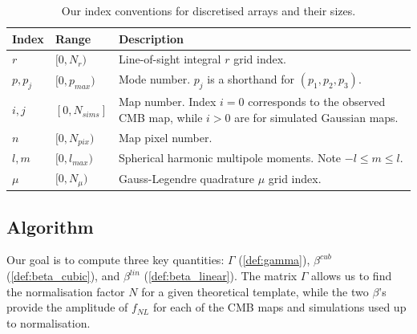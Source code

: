 \documentclass[a4paper,12pt,times,custombib,print,index]{Classes/PhDThesisPSnPDF} %
\providecommand{\DIFadd}[1]{{\protect\color{blue}\uwave{#1}}} %
\providecommand{\DIFdel}[1]{{\protect\color{red}\sout{#1}}}                      %
\providecommand{\DIFaddbegin}{} %
\providecommand{\DIFaddend}{} %
\providecommand{\DIFdelbegin}{} %
\providecommand{\DIFdelend}{} %
\providecommand{\DIFaddFL}[1]{\DIFadd{#1}} %
\providecommand{\DIFdelFL}[1]{\DIFdel{#1}} %
\providecommand{\DIFaddbeginFL}{} %
\providecommand{\DIFaddendFL}{} %
\providecommand{\DIFdelbeginFL}{} %
\providecommand{\DIFdelendFL}{} %
\newcommand{\DIFscaledelfig}{0.5}
\newlength{\DIFdelgraphicswidth} %
\newlength{\DIFdelgraphicsheight} %
\newcommand{\DIFaddincludegraphics}[2][]{{\color{blue}\fbox{\DIFOincludegraphics[#1]{#2}}}} %
\newcommand{\DIFdelincludegraphics}[2][]{%
\sbox{\DIFdelgraphicsbox}{\DIFOincludegraphics[#1]{#2}}%
\settoboxwidth{\DIFdelgraphicswidth}{\DIFdelgraphicsbox} %
\settoboxtotalheight{\DIFdelgraphicsheight}{\DIFdelgraphicsbox} %
\scalebox{\DIFscaledelfig}{%
\parbox[b]{\DIFdelgraphicswidth}{\usebox{\DIFdelgraphicsbox}\\[-\baselineskip] \rule{\DIFdelgraphicswidth}{0em}}\llap{\resizebox{\DIFdelgraphicswidth}{\DIFdelgraphicsheight}{%
\setlength{\unitlength}{\DIFdelgraphicswidth}%
\begin{picture}(1,1)%
\thicklines\linethickness{2pt} %
{\color[rgb]{1,0,0}\put(0,0){\framebox(1,1){}}}%
{\color[rgb]{1,0,0}\put(0,0){\line( 1,1){1}}}%
{\color[rgb]{1,0,0}\put(0,1){\line(1,-1){1}}}%
\end{picture}%
}\hspace*{3pt}}} %
} %
\DeclareRobustCommand{\DIFaddbegin}{\DIFOaddbegin \let\includegraphics\DIFaddincludegraphics} %
\DeclareRobustCommand{\DIFaddend}{\DIFOaddend \let\includegraphics\DIFOincludegraphics} %
\DeclareRobustCommand{\DIFdelbegin}{\DIFOdelbegin \let\includegraphics\DIFdelincludegraphics} %
\DeclareRobustCommand{\DIFdelend}{\DIFOaddend \let\includegraphics\DIFOincludegraphics} %
\DeclareRobustCommand{\DIFaddbeginFL}{\DIFOaddbeginFL \let\includegraphics\DIFaddincludegraphics} %
\DeclareRobustCommand{\DIFaddendFL}{\DIFOaddendFL \let\includegraphics\DIFOincludegraphics} %
\DeclareRobustCommand{\DIFdelbeginFL}{\DIFOdelbeginFL \let\includegraphics\DIFdelincludegraphics} %
\DeclareRobustCommand{\DIFdelendFL}{\DIFOaddendFL \let\includegraphics\DIFOincludegraphics} %
\begin{document}
\begin{table}[htbp]
	\caption{Our index conventions for discretised arrays and their sizes.}
	\centering
	\label{table:index_conventions}
	\renewcommand{\arraystretch}{1.5} 
	\begin{tabular}{m{}  m{}  m{}} \toprule
		Index & Range & Description \\

		\midrule
		$r$ & $[0, N_r)$ & Line-of-sight integral $r$ grid index. \\

		$p, p_j$ & \DIFdelbeginFL \DIFdelFL{$[0, p_{max})$ }\DIFdelendFL \DIFaddbeginFL \DIFaddFL{$[0, p_\text{max})$ }\DIFaddendFL & Mode number. $p_j$ is a shorthand for $(p_1, p_2, p_3)$. \\

		$i,j$ & \DIFdelbeginFL \DIFdelFL{$[0, N_{sims}]$ }\DIFdelendFL \DIFaddbeginFL \DIFaddFL{$[0, N_\text{sims}]$ }\DIFaddendFL & Map number. Index $i=0$ corresponds to the observed CMB map, while $i>0$ are for simulated Gaussian maps. \\			

		$n$ & \DIFdelbeginFL \DIFdelFL{$[0, N_{pix})$ }\DIFdelendFL \DIFaddbeginFL \DIFaddFL{$[0, N_\text{pix})$ }\DIFaddendFL & Map pixel number. \\ 

		$l,m$ & \DIFdelbeginFL \DIFdelFL{$[0, l_{max})$ }\DIFdelendFL \DIFaddbeginFL \DIFaddFL{$[0, l_\text{max})$ }\DIFaddendFL & Spherical harmonic multipole moments. Note $-l \le m \le l$. \\

		$\mu$ & $[0, N_\mu)$ & Gauss-Legendre quadrature $\mu$ grid index. \\

		\bottomrule
	\end{tabular}
\end{table}

\subsection{Algorithm}

Our goal is to compute three key quantities: $\Gamma$ (\ref{def:gamma}), \DIFdelbegin \DIFdel{$\beta^{cub}$ }\DIFdelend \DIFaddbegin \DIFadd{$\beta^\text{cub}$ }\DIFaddend (\ref{def:beta_cubic}), and \DIFdelbegin \DIFdel{$\beta^{lin}$ }\DIFdelend \DIFaddbegin \DIFadd{$\beta^\text{lin}$ }\DIFaddend (\ref{def:beta_linear}). The matrix $\Gamma$ allows us to find the normalisation factor $N$ for a given theoretical template, while the two $\beta$'s provide the amplitude of \DIFdelbegin \DIFdel{$f_{NL}$ }\DIFdelend \DIFaddbegin \DIFadd{$f_\text{NL}$ }\DIFaddend for each of the CMB maps and simulations used up to normalisation.
\end{document}

